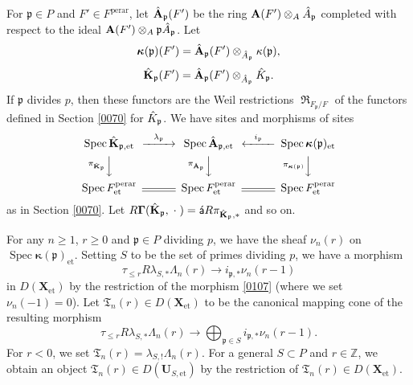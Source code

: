 \documentclass{amsart}
\theoremstyle{remark}
\numberwithin{equation}{section}
\newcommand{\tensor}{\mathbin{\otimes}}
\newcommand{\Z}{\mathbb{Z}}
\newcommand{\et}{\mathrm{et}}
\newcommand{\perar}{\mathrm{perar}}
\newcommand{\alg}[1]{\mathbf{#1}}
\newcommand{\var}{\;\cdot\;}
\newcommand{\ideal}[1]{\mathfrak{#1}}
\newcommand{\algebrize}{\Acute{\mathsf{a}}}
\newcommand{\varalg}[1]{\bm{#1}}
\DeclareMathOperator{\Spec}{Spec}
\DeclareMathOperator{\Weil}{\mathfrak{R}}
\begin{document}
For $\ideal{p} \in P$ and $F' \in F^{\perar}$,
let $\Hat{\alg{A}}_{\ideal{p}}(F')$ be the ring $\alg{A}(F') \tensor_{A} \Hat{A}_{\ideal{p}}$
completed with respect to the ideal $\alg{A}(F') \tensor_{A} \ideal{p} \Hat{A}_{\ideal{p}}$.
Let
	\[
			\varalg{\kappa}(\ideal{p})(F')
		=
				\Hat{\alg{A}}_{\ideal{p}}(F')
			\tensor_{\Hat{A}_{\ideal{p}}}
				\kappa(\ideal{p}),
	\]
	\[
			\Hat{\alg{K}}_{\ideal{p}}(F')
		=
				\Hat{\alg{A}}_{\ideal{p}}(F')
			\tensor_{\Hat{A}_{\ideal{p}}}
				\Hat{K}_{\ideal{p}}.
	\]
If $\ideal{p}$ divides $p$, then these functors are the Weil restrictions $\Weil_{F_{\ideal{p}} / F}$
of the functors defined in Section \ref{0070} for $\Hat{K}_{\ideal{p}}$.
We have sites and morphisms of sites
	\[
		\begin{CD}
				\Spec \Hat{\alg{K}}_{\ideal{p}, \et}
			@> \lambda_{\ideal{p}} >>
				\Spec \Hat{\alg{A}}_{\ideal{p}, \et}
			@< i_{\ideal{p}} <<
				\Spec \varalg{\kappa}(\ideal{p})_{\et}
			\\
			@V \pi_{\Hat{\alg{K}}_{\ideal{p}}} VV
			@V \pi_{\Hat{\alg{A}}_{\ideal{p}}} VV
			@V \pi_{\varalg{\kappa}(\ideal{p})} VV
			\\
				\Spec F^{\perar}_{\et}
			@=
				\Spec F^{\perar}_{\et}
			@=
				\Spec F^{\perar}_{\et}
		\end{CD}
	\]
as in Section \ref{0070}.
Let $R \alg{\Gamma}(\Hat{\alg{K}}_{\ideal{p}}, \var) = \algebrize R \pi_{\Hat{\alg{K}}_{\ideal{p}}, \ast}$ and so on.

For any $n \ge 1$, $r \ge 0$ and $\ideal{p} \in P$ dividing $p$,
we have the sheaf $\nu_{n}(r)$ on $\Spec \varalg{\kappa}(\ideal{p})_{\et}$.
Setting $S$ to be the set of primes dividing $p$,
we have a morphism
	\[
			\tau_{\le r}
			R \lambda_{S, \ast} \Lambda_{n}(r)
		\to
			i_{\ideal{p}, \ast} \nu_{n}(r - 1)
	\]
in $D(\alg{X}_{\et})$
by the restriction of the morphism \eqref{0107}
(where we set $\nu_{n}(-1) = 0$).
Let $\mathfrak{T}_{n}(r) \in D(\alg{X}_{\et})$ to be
the canonical mapping cone of the resulting morphism
	\[
			\tau_{\le r}
			R \lambda_{S, \ast} \Lambda_{n}(r)
		\to
			\bigoplus_{\ideal{p} \in S}
				i_{\ideal{p}, \ast} \nu_{n}(r - 1).
	\]
For $r < 0$, we set $\mathfrak{T}_{n}(r) = \lambda_{S, !} \Lambda_{n}(r)$.
For a general $S \subset P$ and $r \in \Z$,
we obtain an object $\mathfrak{T}_{n}(r) \in D(\alg{U}_{S, \et})$
by the restriction of $\mathfrak{T}_{n}(r) \in D(\alg{X}_{\et})$.
\end{document}
